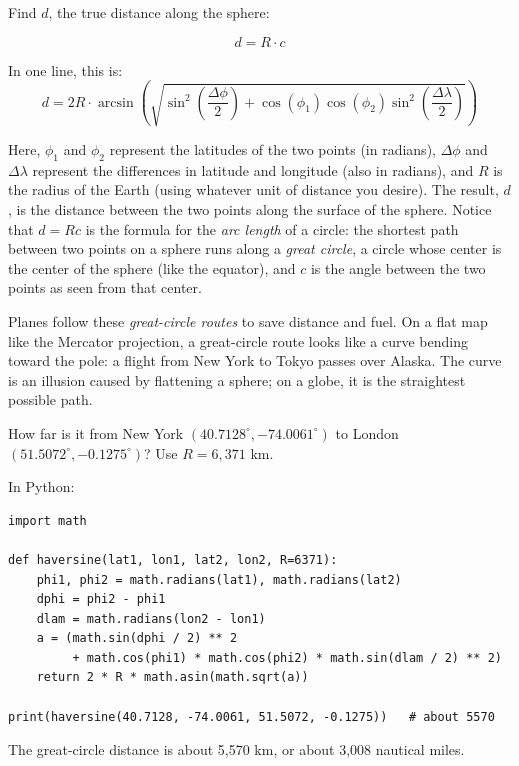 Find $d$, the true distance along the sphere:

\[
d = R \cdot c
\]

In one line, this is:
$$
d = 2R \cdot \arcsin\left( \sqrt{\sin^2\left(\frac{\Delta\phi}{2}\right) + \cos(\phi_1) \cos(\phi_2) \sin^2\left(\frac{\Delta\lambda}{2}\right)} \right)
$$

Here, $\phi_1$ and $\phi_2$ represent the latitudes of the two points (in radians),
$\Delta\phi$ and $\Delta\lambda$ represent the differences in latitude
and longitude (also in radians), and $R$ is the radius of the
Earth (using whatever unit of distance you desire). The result, $d$, is the distance between the two points along
the surface of the sphere. Notice that $d = Rc$ is the formula for the \emph{arc length} of a circle: the shortest path between two points on a sphere runs along a \emph{great circle}, a circle whose center is the center of the sphere (like the equator), and $c$ is the angle between the two points as seen from that center. 

Planes follow these \emph{great-circle routes} to save distance and fuel. On a flat map like the Mercator projection, a great-circle route looks like a curve bending toward the pole: a flight from New York to Tokyo passes over Alaska. The curve is an illusion caused by flattening a sphere; on a globe, it is the straightest possible path.

\begin{Worked}
\begin{Problem}
How far is it from New York $(40.7128^\circ, -74.0061^\circ)$ to London $(51.5072^\circ, -0.1275^\circ)$? Use $R = 6{,}371$ km.
\end{Problem}
\begin{Solution}
In Python:
\begin{verbatim}
import math

def haversine(lat1, lon1, lat2, lon2, R=6371):
    phi1, phi2 = math.radians(lat1), math.radians(lat2)
    dphi = phi2 - phi1
    dlam = math.radians(lon2 - lon1)
    a = (math.sin(dphi / 2) ** 2
         + math.cos(phi1) * math.cos(phi2) * math.sin(dlam / 2) ** 2)
    return 2 * R * math.asin(math.sqrt(a))

print(haversine(40.7128, -74.0061, 51.5072, -0.1275))   # about 5570
\end{verbatim}
The great-circle distance is about 5,570 km, or about 3,008 nautical miles.
\end{Solution}
\end{Worked}

